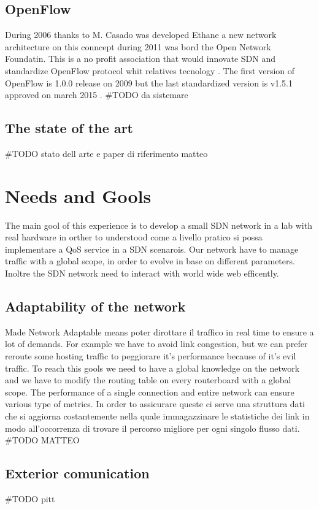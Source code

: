 \documentclass[conference,10pt]{IEEEtran}
\begin{document}
  \subsection{OpenFlow}
  During 2006 thanks to M. Casado was developed Ethane a new network architecture on this conncept during 2011 was bord the Open Network Foundatin.
  This is a no profit association that would innovate SDN and standardize OpenFlow protocol whit relatives tecnology \cite{ONF}.
  The first version of OpenFlow is 1.0.0 release on 2009 but the last standardized version is v1.5.1 approved on march 2015 \cite{ONF_report}.
  \#TODO da sistemare
  \subsection{The state of the art}
  \#TODO stato dell arte e paper di riferimento  matteo

\section{Needs and Gools}\label{sec:obb} %
The main gool of this experience is to develop a small SDN network in a lab with real hardware
in orther to understood come a livello pratico si possa implementare  a QoS service in a SDN scenarois.
Our network have to manage traffic with a global scope, in order to evolve in base on different parameters.
Inoltre the SDN network need to interact with world wide web efficently.
  \subsection{Adaptability of the network}
  Made Network Adaptable means poter dirottare il traffico in real time to ensure a lot of demands. For example we have to avoid link congestion, 
  but we can prefer reroute some hosting traffic to peggiorare it's performance because of it's evil traffic.
  To reach this gools we need to have a global knowledge on the network and we have to modify the routing table on every routerboard with a 
  global scope.
  The performance of a single connection and entire network can ensure various type of metrics.
  In order to assicurare queste ci serve una struttura dati che si aggiorna costantemente nella quale immagazzinare le statistiche dei link 
  in modo all'occorrenza di trovare il percorso migliore per ogni singolo flusso dati.
  \#TODO MATTEO
  \subsection{Exterior comunication}
  \#TODO pitt
  
\end{document}
